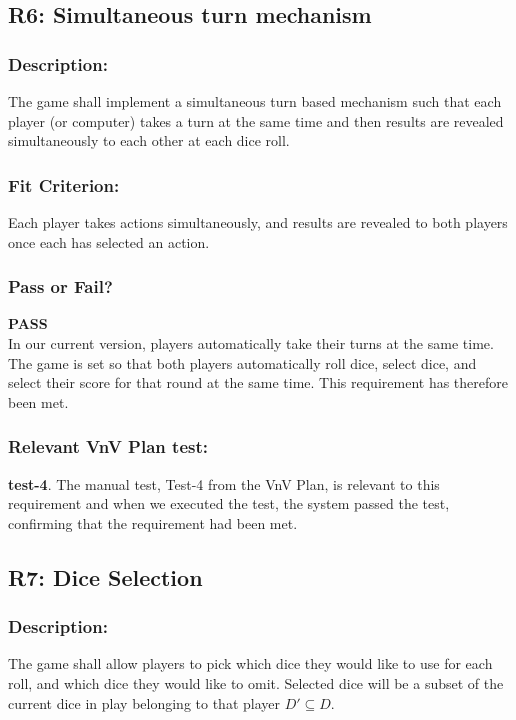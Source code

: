 \documentclass[12pt, titlepage]{article}
\begin{document}
\subsection{R6: Simultaneous turn mechanism} 

\subsubsection{Description:}The game shall implement a simultaneous turn based mechanism such that each player (or computer) takes a turn at the same time and then results are revealed simultaneously to each other at each dice roll.

\subsubsection{Fit Criterion:} Each player takes actions simultaneously, and results are revealed to both players once each has selected an action.

\subsubsection{Pass or Fail?} 

 \noindent \textbf{PASS}\\
 
 \noindent In our current version, players automatically take their turns at the same time. The game is set so that both players automatically roll dice, select dice, and select their score for that round at the same time. This requirement has therefore been met.

\subsubsection{Relevant VnV Plan test: } \textbf{test-4}.  The manual test, Test-4 from the VnV Plan, is relevant to this requirement and when we executed the test, the system passed the test, confirming that the requirement had been met.

\subsection{R7: Dice Selection} 

\subsubsection{Description:} The game shall allow players to pick which dice they would like to use for each roll, and which dice they would like to omit. Selected dice will be a subset of the current dice in play belonging to that player $D' \subseteq D$.
\end{document}
